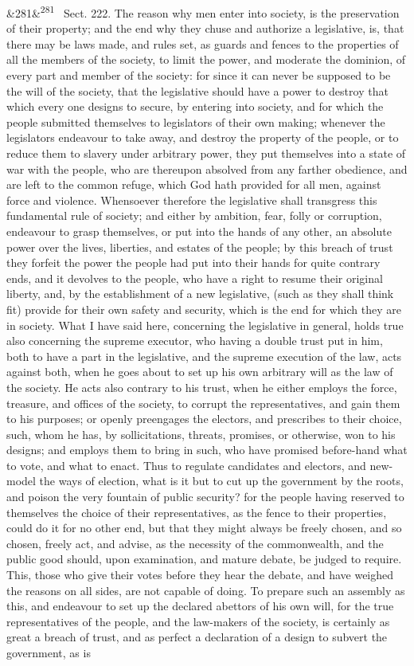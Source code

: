 \documentclass[12pt]{article}
\newcommand{\para}[1][]{\par\noindent\ifx&#1&\else\textsuperscript{\footnotesize #1}~\fi}
\begin{document}
\para[281] Sect. 222. The reason why men enter into society, is the preservation of their property; and the end why they chuse and authorize a legislative, is, that there may be laws made, and rules set, as guards and fences to the properties of all the members of the society, to limit the power, and moderate the dominion, of every part and member of the society: for since it can never be supposed to be the will of the society, that the legislative should have a power to destroy that which every one designs to secure, by entering into society, and for which the people submitted themselves to legislators of their own making; whenever the legislators endeavour to take away, and destroy the property of the people, or to reduce them to slavery under arbitrary power, they put themselves into a state of war with the people, who are thereupon absolved from any farther obedience, and are left to the common refuge, which God hath provided for all men, against force and violence. Whensoever therefore the legislative shall transgress this fundamental rule of society; and either by ambition, fear, folly or corruption, endeavour to grasp themselves, or put into the hands of any other, an absolute power over the lives, liberties, and estates of the people; by this breach of trust they forfeit the power the people had put into their hands for quite contrary ends, and it devolves to the people, who have a right to resume their original liberty, and, by the establishment of a new legislative, (such as they shall think fit) provide for their own safety and security, which is the end for which they are in society. What I have said here, concerning the legislative in general, holds true also concerning the supreme executor, who having a double trust put in him, both to have a part in the legislative, and the supreme execution of the law, acts against both, when he goes about to set up his own arbitrary will as the law of the society. He acts also contrary to his trust, when he either employs the force, treasure, and offices of the society, to corrupt the representatives, and gain them to his purposes; or openly preengages the electors, and prescribes to their choice, such, whom he has, by sollicitations, threats, promises, or otherwise, won to his designs; and employs them to bring in such, who have promised before-hand what to vote, and what to enact. Thus to regulate candidates and electors, and new-model the ways of election, what is it but to cut up the government by the roots, and poison the very fountain of public security? for the people having reserved to themselves the choice of their representatives, as the fence to their properties, could do it for no other end, but that they might always be freely chosen, and so chosen, freely act, and advise, as the necessity of the commonwealth, and the public good should, upon examination, and mature debate, be judged to require. This, those who give their votes before they hear the debate, and have weighed the reasons on all sides, are not capable of doing. To prepare such an assembly as this, and endeavour to set up the declared abettors of his own will, for the true representatives of the people, and the law-makers of the society, is certainly as great a breach of trust, and as perfect a declaration of a design to subvert the government, as is 
\end{document}
